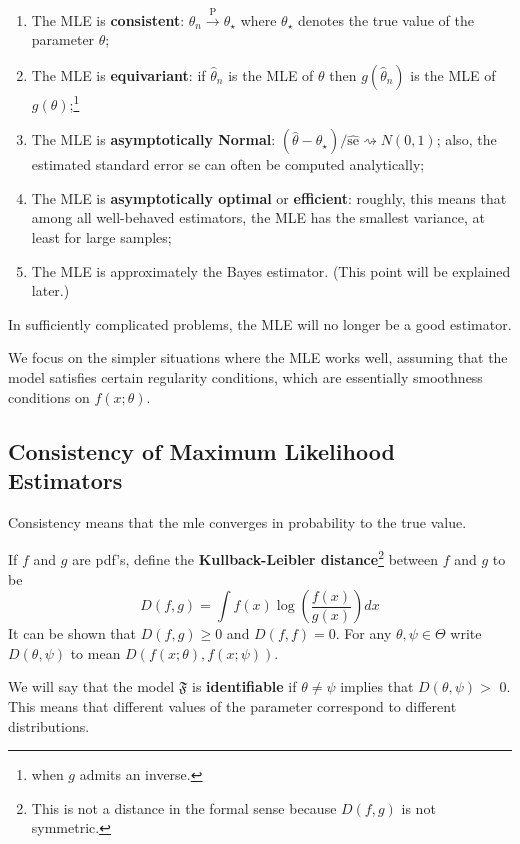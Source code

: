 \begin{enumerate}
	\item The MLE is \textbf{consistent}: $\widehat{\theta}_n \xrightarrow{\mathrm{P}} \theta_{\star}$ where $\theta_{\star}$ denotes the true value of the parameter $\theta$;
	\item The MLE is \textbf{equivariant}: if $\widehat{\theta}_n$ is the MLE of $\theta$ then $g\left(\widehat{\theta}_n\right)$ is the MLE of $g(\theta)$;\footnote{when $g$ admits an inverse.}
	\item The MLE is \textbf{asymptotically Normal}: $\left(\widehat{\theta}-\theta_{\star}\right) / \widehat{\mathrm{se}} \rightsquigarrow N(0,1)$; also, the estimated standard error se can often be computed analytically;
	\item The MLE is \textbf{asymptotically optimal} or \textbf{efficient}: roughly, this means that among all well-behaved estimators, the MLE has the smallest variance, at least for large samples;
	\item The MLE is approximately the Bayes estimator. (This point will be explained later.)
\end{enumerate}

In sufficiently complicated problems, the MLE will no longer be a good estimator.

We focus on the simpler situations where the MLE works well, assuming that the model satisfies certain regularity conditions, which are essentially smoothness conditions on $f(x ; \theta)$.

\subsection{Consistency of Maximum Likelihood Estimators}

Consistency means that the mle converges in probability to the true value.

\begin{definition}
If $f$ and $g$ are pdf's, define the \textbf{Kullback-Leibler distance}\footnote{This is not a distance in the formal sense because $D(f, g)$ is not symmetric.} between $f$ and $g$ to be
\[
D(f, g)=\int f(x) \log \left(\frac{f(x)}{g(x)}\right) d x
\]It can be shown that $D(f, g) \geq 0$ and $D(f, f)=0$. For any $\theta, \psi \in \Theta$ write $D(\theta, \psi)$ to mean $D(f(x ; \theta), f(x ; \psi))$.
\end{definition}
We will say that the model $\mathfrak{F}$ is \textbf{identifiable} if $\theta \neq \psi$ implies that $D(\theta, \psi)>$ 0. This means that different values of the parameter correspond to different distributions.

